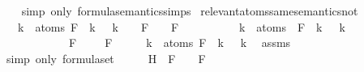 \begin{isabellebody}
%
\isadelimproof
\ \ %
\endisadelimproof
%
\isatagproof
{}\isamarkupfalse%
\ {\isacharparenleft}simp\ only{\isacharcolon}\ formula{\isacharunderscore}semantics{\isachardot}simps{\isacharparenleft}{}{\isacharparenright}{\isacharparenright}%
\endisatagproof
{\isafoldproof}%
%
\isadelimproof
\isanewline
%
\endisadelimproof
\isanewline
{}\isamarkupfalse%
\ relevant{\isacharunderscore}atoms{\isacharunderscore}same{\isacharunderscore}semantics{\isacharunderscore}not{\isacharcolon}\ \isanewline
\ \ \ {\isachardoublequoteopen}{\isasymforall}k\ {\isasymin}\ atoms\ F{\isachardot}\ {\isasymA}\ k\ {\isacharequal}\ {\isasymA}\ k\ {\isasymLongrightarrow}\ {\isasymA}\ {\isasymTurnstile}\ F\ {\isasymlongleftrightarrow}\ {\isasymA}\ {\isasymTurnstile}\ F{\isachardoublequoteclose}\isanewline
\ \ \ \ \ \ \ \ \ \ {\isachardoublequoteopen}{\isasymforall}k\ {\isasymin}\ atoms\ {\isacharparenleft}\isactrlbold {\isasymnot}\ F{\isacharparenright}{\isachardot}\ {\isasymA}\ k\ {\isacharequal}\ {\isasymA}\ k{\isachardoublequoteclose}\isanewline
\ \ \ \ \ \ \ \ \ {\isachardoublequoteopen}{\isasymA}\ {\isasymTurnstile}\ {\isacharparenleft}\isactrlbold {\isasymnot}\ F{\isacharparenright}\ {\isasymlongleftrightarrow}\ {\isasymA}\ {\isasymTurnstile}\ {\isacharparenleft}\isactrlbold {\isasymnot}\ F{\isacharparenright}{\isachardoublequoteclose}\isanewline
%
\isadelimproof
%
\endisadelimproof
%
\isatagproof
{}\isamarkupfalse%
\ {\isacharminus}\isanewline
\ \ \isamarkupfalse%
\ {\isachardoublequoteopen}{\isasymforall}k\ {\isasymin}\ atoms\ F{\isachardot}\ {\isasymA}\ k\ {\isacharequal}\ {\isasymA}\ k{\isachardoublequoteclose}\ \isamarkupfalse%
\ assms{\isacharparenleft}{}{\isacharparenright}\isanewline
\ \ \ \ \isamarkupfalse%
\ {\isacharparenleft}simp\ only{\isacharcolon}\ formula{\isachardot}set{\isacharparenleft}{}{\isacharparenright}{\isacharparenright}\isanewline
\ \ \isamarkupfalse%
\ \isamarkupfalse%
\ H{\isacharcolon}{\isachardoublequoteopen}{\isasymA}\ {\isasymTurnstile}\ F\ {\isasymlongleftrightarrow}\ {\isasymA}\ {\isasymTurnstile}\ F{\isachardoublequoteclose}\isanewline
\ \ \ \ \isamarkupfalse%

\end{isabellebody}
